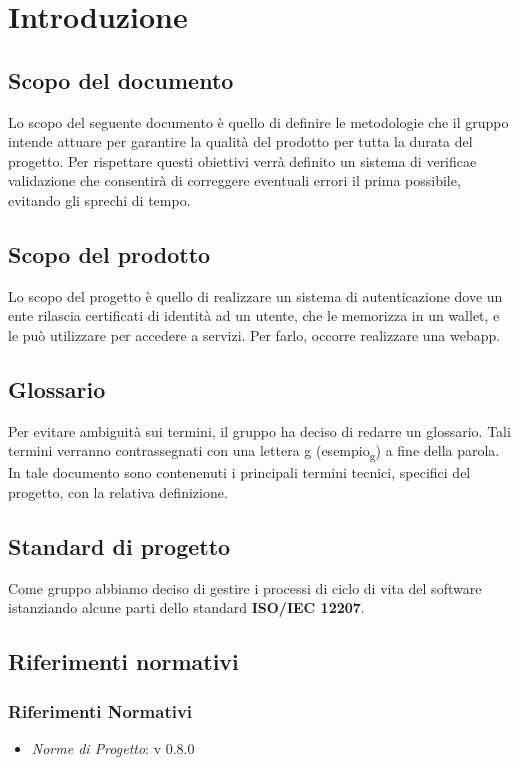 \section{Introduzione}
\subsection{Scopo del documento}
Lo scopo del seguente documento è quello di definire le metodologie che il gruppo intende attuare per garantire la qualità del prodotto per tutta la durata del progetto.
Per rispettare questi obiettivi verrà definito un sistema di verifica\glo e validazione che consentirà di correggere eventuali errori il prima possibile, evitando gli sprechi di tempo.
\subsection{Scopo del prodotto} %
Lo scopo del progetto è quello di realizzare un sistema di autenticazione dove un ente rilascia
certificati di identità ad un utente, che le memorizza in un wallet\glo, e le può utilizzare
per accedere a servizi. Per farlo, occorre realizzare una webapp.
\subsection{Glossario}
Per evitare ambiguità sui termini, il gruppo ha deciso di redarre un glossario. Tali termini verranno contrassegnati con una lettera g (esempio\textsubscript{g}) a fine della parola. In tale documento sono contenenuti i principali termini tecnici, specifici del progetto, con la relativa definizione.
\subsection{Standard di progetto}
Come gruppo abbiamo deciso di gestire i processi di ciclo di vita del software istanziando alcune parti dello standard \textbf{ISO/IEC 12207}.
\subsection{Riferimenti normativi}%
\subsubsection{Riferimenti Normativi}
\begin{itemize}
    \item \textit{Norme di Progetto}: v 0.8.0
\end{itemize}
